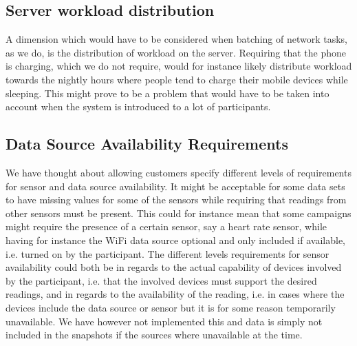 
\subsection{Server workload distribution}

A dimension which would have to be considered when batching of network tasks, as we do, is the distribution of workload on the server. Requiring that the phone is charging, which we do not require, would for instance likely distribute workload towards the nightly hours where people tend to charge their mobile devices while sleeping. This might prove to be a problem that would have to be taken into account when the system is introduced to a lot of participants.  

\subsection{Data Source Availability Requirements}

We have thought about allowing customers specify different levels of requirements for sensor and data source availability. It might be acceptable for some data sets to have missing values for some of the sensors while requiring that readings from other sensors must be present. This could for instance mean that some campaigns might require the presence of a certain sensor, say a heart rate sensor, while having for instance the WiFi data source optional and only included if available, i.e. turned on by the participant. The different levels requirements for sensor availability could both be in regards to the actual capability of devices involved by the participant, i.e. that the involved devices must support the desired readings, and in regards to the availability of the reading, i.e. in cases where the devices include the data source or sensor but it is for some reason temporarily unavailable. We have however not implemented this and data is simply not included in the snapshots if the sources where unavailable at the time.
